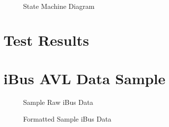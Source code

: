 \begin{figure}
	\caption{State Machine Diagram}
\label{fig:stateMachine}
\end{figure}

\FloatBarrier
\section{Test Results}

\section{iBus AVL Data Sample}
\begin{figure}[ht!]
	\caption{Sample Raw iBus Data}
\label{fig:rawDataSample}
\end{figure}

\begin{figure}[ht!]
	\caption{Formatted Sample iBus Data}
\label{fig:formattedDataSample}
\end{figure}

\FloatBarrier